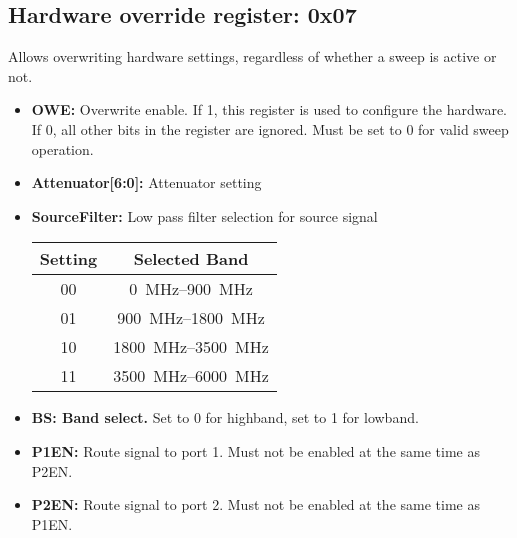 \documentclass{article}
\newcommand{\bitrect}[2]{
  \begin{pgfonlayer}{foreground}
    \draw [thick] (0,0) rectangle (#1,1);
    \pgfmathsetmacro\result{#1-1}
    \foreach \x in {1,...,\result}
      \draw [thick] (\x,1) -- (\x, 0.8);
  \end{pgfonlayer}
  \bitlabels{#1}{#2}
}
\newcommand{\rwbits}[3]{
  \draw [thick] (#1,0) rectangle ++(#2,1) node[pos=0.5]{#3};
  \pgfmathsetmacro\start{#1+0.5}
  \pgfmathsetmacro\finish{#1+#2-0.5}
}
\newcommand{\robits}[3]{
  \begin{pgfonlayer}{background}
    \draw [thick, fill=lightgray] (#1,0) rectangle ++(#2,1) node[pos=0.5]{#3};
  \end{pgfonlayer}
  \pgfmathsetmacro\start{#1+0.5}
  \pgfmathsetmacro\finish{#1+#2-0.5}
}
\newcommand{\bitlabels}[2]{
  \foreach \bit in {1,...,#1}{
     \pgfmathsetmacro\result{#2}
     \node [above] at (\bit-0.5, 1) {\pgfmathprintnumber{\result}};
   }
}
\begin{document}
\subsection{Hardware override register: 0x07}
Allows overwriting hardware settings, regardless of whether a sweep is active or not.
\label{reg:hw_override}
\begin{center}
\end{center}
\begin{itemize}
\item \textbf{OWE:} Overwrite enable. If 1, this register is used to configure the hardware. If 0, all other bits in the register are ignored. Must be set to 0 for valid sweep operation.
\item \textbf{Attenuator[6:0]:} Attenuator setting
\item \textbf{SourceFilter:} Low pass filter selection for source signal
\begin{center}
\begin{tabular}{ c|c }
Setting & Selected Band\\
 \hline
00 & \SIrange{0}{900}{\mega\hertz}\\
01 & \SIrange{900}{1800}{\mega\hertz}\\
10 & \SIrange{1800}{3500}{\mega\hertz}\\
11 & \SIrange{3500}{6000}{\mega\hertz}\\
\end{tabular}
\end{center}
\item \textbf{BS: Band select.} Set to 0 for highband, set to 1 for lowband.
\item \textbf{P1EN:} Route signal to port 1. Must not be enabled at the same time as P2EN.
\item \textbf{P2EN:} Route signal to port 2. Must not be enabled at the same time as P1EN.
\end{itemize}
\end{document}
